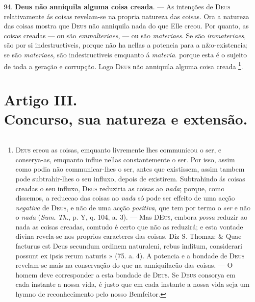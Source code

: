  94. \textbf{Deus não anniquila alguma coisa creada}. --- As intenções de \textsc{Deus} relativamente ás coisas revelam-se na propria natureza das coisas. Ora a natureza das coisas mostra que \textsc{Deus} não anniquila nada do que Elle creou. Por quanto, as coisas creadas --- ou são \emph{emmalteriaes}, --- ou são \emph{materiaes}. Se são \emph{immateriaes}, são por si indestruetiveis, porque não ha nellas a potencia para a n\&o-existencia; se são \emph{materiaes}, são indestructiveis emquanto á \emph{materia}. porque esta é o sujeito de toda a geração e corrupção. Logo \textsc{Deus} não anniquila alguma coisa creada \footnote{\textsc{Deus} ereou as coisas, emquanto livremente lhes communicou o ser, e conserya-as, emquanto influe nellas constantemente o ser. Por isso, assim como podia não communicar-lhes o ser, antes que existissem, assim tambem pode subtrahir-lhes o seu influxo, depois de existirem. Subtrahindo ás coisas creadas o seu influxo, \textsc{Deus} reduziria as coisas ao \emph{nada}; porque, como dissemos, a reduecao das coisas ao \emph{nada} só pode ser effeito de uma acção \emph{negativa} de \textsc{Deus}, e não de uma acção \emph{positiva}, que tem por termo o \emph{ser} e não o \emph{nada} (\emph{Sum}. \emph{Th}., p. Y, q. 104, a. 3). --- Mas \textsc{DEus}, embora \emph{possa} reduzir ao nada as coisas creadas, comtudo é certo que não as reduzirá; e esta vontade divina revela-se nos proprios caracteres das coisas. Diz S. Thomaz: \& Quae facturus est Deus secundum ordinem naturaleni, rebus inditum, considerari possunt ex ipsis rerum naturis » (75. a. 4). A potencia e a bondade de \textsc{Deus} revelam-se mais na conservação do que na anniquilacüo das coisas. --- O homem deve corresponder a esta bondade de \textsc{Deus}. Se \textsc{Deus} consorya em cada instante a nossa vida, é justo que em cada instante a nossa vida seja um hymno de reconhecimento pelo nosso Bemfeitor.}.


\section*{Artigo III.\\ Concurso, sua natureza e extensão.}

